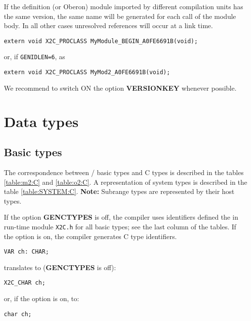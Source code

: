 If the definition (or Oberon) module imported by different
compilation units has the same version, the same name will be
generated for each call of the module body. In all other cases
unresolved references will occur at a link time.

\Example
\begin{verbatim}
extern void X2C_PROCLASS MyModule_BEGIN_A0FE6691B(void);
\end{verbatim}
or, if {\tt GENIDLEN=6}, as
\begin{verbatim}
extern void X2C_PROCLASS MyMod2_A0FE6691B(void);
\end{verbatim}

We recommend to switch ON the option {\bf VERSIONKEY} whenever
possible.


\section{Data types}\label{maproc:types}

\subsection{Basic types}

The correspondence between \mt{}/\ot{} basic types and C types is described
in the tables \ref{table:m2:C} and \ref{table:o2:C}.
A representation of system types is described
in the table \ref{table:SYSTEM:C}.
{\bf Note:} Subrange types are represented by their host types.

If the option {\bf GENCTYPES} is off, the compiler uses
identifiers defined the in run-time module {\tt X2C.h} for all basic
types; see the last column of the tables. If the option is on,
the compiler generates C type identifiers.
\begin{verbatim}
VAR ch: CHAR;
\end{verbatim}
translates to ({\bf GENCTYPES} is off):
\begin{verbatim}
X2C_CHAR ch;
\end{verbatim}
or, if the option is on, to:
\begin{verbatim}
char ch;
\end{verbatim}

